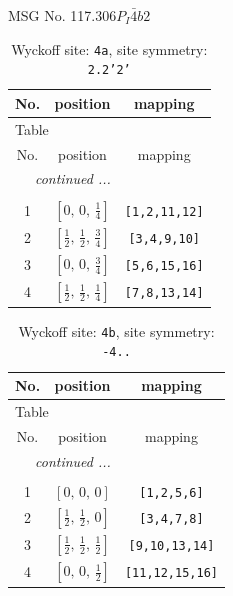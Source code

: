 \documentclass[fleqn,8pt]{jsarticle}
\begin{document}
\setcounter{MaxMatrixCols}{32}

\renewcommand{\tablename}{Table~}
\renewcommand{\figurename}{Figure~}
\begin{center}
\LARGE
MSG No. 117.306\quad$P_{I}\bar{4}b2$
\end{center}
\renewcommand{\arraystretch}{1.2}
\begin{longtable}{ccc}
\caption{Wyckoff site: {\tt 4a}, site symmetry: {\tt 2.2'2'}}
 \\
 \hline \hline
No. & position & mapping \\ \hline \endfirsthead

\multicolumn{2}{l}{\tablename\ \thetable{}} \\
 \hline \hline
No. & position & mapping \\ \hline \endhead

 \hline \hline
\multicolumn{2}{r}{\footnotesize\it continued ...} \\ \endfoot

 \hline \hline
\multicolumn{2}{r}{} \\ \endlastfoot

1 & $\left[ 0,\, 0,\, \frac{1}{4} \right]$ & {\tt [1,2,11,12]} \\ \hline
2 & $\left[ \frac{1}{2},\, \frac{1}{2},\, \frac{3}{4} \right]$ & {\tt [3,4,9,10]} \\ \hline
3 & $\left[ 0,\, 0,\, \frac{3}{4} \right]$ & {\tt [5,6,15,16]} \\ \hline
4 & $\left[ \frac{1}{2},\, \frac{1}{2},\, \frac{1}{4} \right]$ & {\tt [7,8,13,14]} \\
\end{longtable}
\renewcommand{\arraystretch}{1.2}
\begin{longtable}{ccc}
\caption{Wyckoff site: {\tt 4b}, site symmetry: {\tt -4..}}
 \\
 \hline \hline
No. & position & mapping \\ \hline \endfirsthead

\multicolumn{2}{l}{\tablename\ \thetable{}} \\
 \hline \hline
No. & position & mapping \\ \hline \endhead

 \hline \hline
\multicolumn{2}{r}{\footnotesize\it continued ...} \\ \endfoot

 \hline \hline
\multicolumn{2}{r}{} \\ \endlastfoot

1 & $\left[ 0,\, 0,\, 0 \right]$ & {\tt [1,2,5,6]} \\ \hline
2 & $\left[ \frac{1}{2},\, \frac{1}{2},\, 0 \right]$ & {\tt [3,4,7,8]} \\ \hline
3 & $\left[ \frac{1}{2},\, \frac{1}{2},\, \frac{1}{2} \right]$ & {\tt [9,10,13,14]} \\ \hline
4 & $\left[ 0,\, 0,\, \frac{1}{2} \right]$ & {\tt [11,12,15,16]} \\
\end{longtable}
\end{document}
